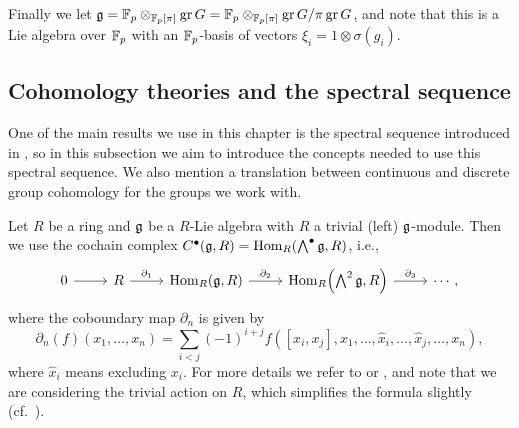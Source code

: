Finally we let $\mathfrak{g} = \mathbb{F}_{p} \otimes_{\mathbb{F}_{p}[\pi]} \operatorname{gr} G = \mathbb{F}_{p} \otimes_{\mathbb{F}_{p}[\pi]} \operatorname{gr} G/\pi\operatorname{gr} G$, and note that this is a Lie algebra over $\mathbb{F}_{p}$ with an $\mathbb{F}_{p}$-basis of vectors $\xi_{i} = 1 \otimes \sigma(g_{i})$. %

\subsection{Cohomology theories and the spectral sequence}%
\label{subsec:coh-and-spec-seq}

One of the main results we use in this chapter is the spectral sequence introduced in \cite[§6.1]{Sor}, so in this subsection we aim to introduce the concepts needed to use this spectral sequence. We also mention a translation between continuous and discrete group cohomology for the groups we work with.

Let $R$ be a ring and $\mathfrak{g}$ be a $R$-Lie algebra with $R$ a trivial (left) $\mathfrak{g}$-module. Then we use the cochain complex $C^\bullet(\mathfrak{g},R) = \operatorname{Hom}_{R}(\bigwedge^{\bullet}\mathfrak{g}, R)$, i.e.,
\[
  \begin{tikzcd}
    0 \ar[r] & R \ar[r,"\partial_{1}"] & \Hom_{R}(\lie{g},R) \ar[r,"\partial_{2}"] & \Hom_{R}\Bigl(\bigwedge^2\lie{g}, R\Bigr) \ar[r,"\partial_{3}"] &  \cdots,
  \end{tikzcd}
\]
where the coboundary map $\partial_{n}$ is given by
\begin{equation*}
  \partial_{n}(f)(x_1,\dotsc,x_{n}) = \sum_{i<j}(-1)^{i+j}f([x_i,x_j],x_1,\dotsc,\widehat{x}_i,\dotsc,\widehat{x}_j,\dotsc,x_{n}),
\end{equation*}
where $\widehat{x}_{i}$ means excluding $x_{i}$. For more details we refer to \cite[Thm.~7.1]{CartanHomAlg} or \cite[§3]{Fuks}, and note that we are considering the trivial action on $R$, which simplifies the formula slightly (cf.\ \cite[§3.2]{Fuks}).

